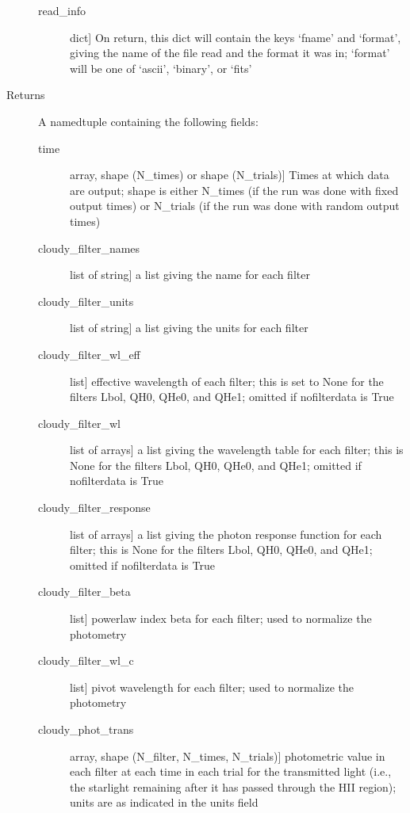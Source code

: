 \documentclass[letterpaper,10pt,english]{sphinxmanual}
\begin{document}
\begin{fulllineitems}
\begin{description}
\begin{description}
\item[{read\_info}] \leavevmode{[}dict{]}
On return, this dict will contain the keys ‘fname’ and
‘format’, giving the name of the file read and the format it
was in; ‘format’ will be one of ‘ascii’, ‘binary’, or ‘fits’

\end{description}

\item[{Returns}] \leavevmode
A namedtuple containing the following fields:
\begin{description}
\item[{time}] \leavevmode{[}array, shape (N\_times) or shape (N\_trials){]}
Times at which data are output; shape is either N\_times (if
the run was done with fixed output times) or N\_trials (if
the run was done with random output times)

\item[{cloudy\_filter\_names}] \leavevmode{[}list of string{]}
a list giving the name for each filter

\item[{cloudy\_filter\_units}] \leavevmode{[}list of string{]}
a list giving the units for each filter

\item[{cloudy\_filter\_wl\_eff}] \leavevmode{[}list{]}
effective wavelength of each filter; this is set to None for the
filters Lbol, QH0, QHe0, and QHe1; omitted if nofilterdata is
True

\item[{cloudy\_filter\_wl}] \leavevmode{[}list of arrays{]}
a list giving the wavelength table for each filter; this is
None for the filters Lbol, QH0, QHe0, and QHe1; omitted if
nofilterdata is True

\item[{cloudy\_filter\_response}] \leavevmode{[}list of arrays{]}
a list giving the photon response function for each filter;
this is None for the filters Lbol, QH0, QHe0, and QHe1; omitted
if nofilterdata is True

\item[{cloudy\_filter\_beta}] \leavevmode{[}list{]}
powerlaw index beta for each filter; used to normalize the
photometry

\item[{cloudy\_filter\_wl\_c}] \leavevmode{[}list{]}
pivot wavelength for each filter; used to normalize the photometry

\item[{cloudy\_phot\_trans}] \leavevmode{[}array, shape (N\_filter, N\_times, N\_trials){]}
photometric value in each filter at each time in each trial for
the transmitted light (i.e., the starlight remaining after it
has passed through the HII region); units are as indicated in
the units field


\end{description}
\end{description}
\end{fulllineitems}
\end{document}
